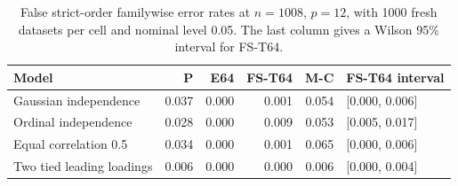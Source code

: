 \begin{table}[htbp]\centering
\caption{False strict-order familywise error rates at $n=1008$, $p=12$, with 1000 fresh datasets per cell and nominal level 0.05. The last column gives a Wilson 95\% interval for FS-T64.}\label{tab:new-null}
\begin{tabular}{lrrrrl}\toprule Model & P & E64 & FS-T64 & M-C & FS-T64 interval\\\midrule
Gaussian independence & 0.037 & 0.000 & 0.001 & 0.054 & [0.000, 0.006]\\
Ordinal independence & 0.028 & 0.000 & 0.009 & 0.053 & [0.005, 0.017]\\
Equal correlation 0.5 & 0.034 & 0.000 & 0.001 & 0.065 & [0.000, 0.006]\\
Two tied leading loadings & 0.006 & 0.000 & 0.000 & 0.006 & [0.000, 0.004]\\
\bottomrule\end{tabular}\end{table}
